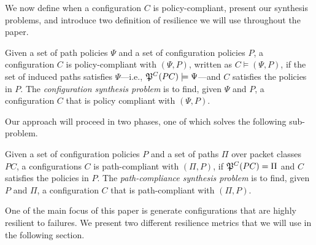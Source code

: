 



\noindent We now define when a configuration $C$ is policy-compliant, present our synthesis problems, and introduce two definition of resilience we will use throughout the paper.
\begin{definition} \label{def:policycompliance}
	Given a set of path policies $\Psi$ and a set of configuration policies $P$,
	a configuration $C$ is policy-compliant with $(\Psi,P)$,  
	written as $C \models (\Psi,P)$, if the set of
	induced paths satisfies $\Psi$---i.e., $\mathfrak{P}^C(PC) \models \Psi$---and $C$ satisfies the policies in $P$.
	The \emph{configuration synthesis problem} is to find, given $\Psi$ and $P$,
a configuration $C$ that is policy compliant with $(\Psi,P)$.
\end{definition}

Our approach will proceed in two phases,
one of which solves the following sub-problem.  
\begin{definition} \label{def:pathcompliance}
Given a set of configuration policies $P$
and a set of paths $\Pi$ over packet classes $PC$,
	a configurations $C$ is path-compliant with 
	$(\Pi,P)$,
	if $\mathfrak{P}^C(PC)=\Pi$ and $C$ satisfies the policies in $P$.
	The \emph{path-compliance synthesis problem} is to find, given $P$ and $\Pi$,
a configuration $C$ that is path-compliant with $(\Pi,P)$.
\end{definition}

One of the main focus of this paper is
generate configurations that are highly resilient to failures.
We present two different resilience metrics that we will use in the following section.


